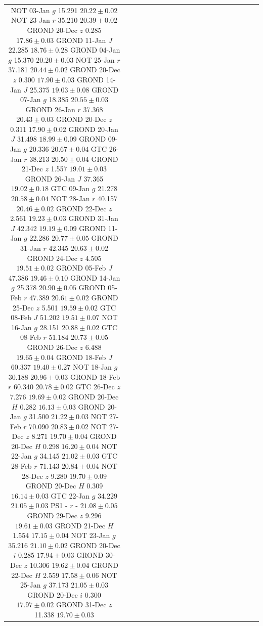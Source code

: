 \documentclass[traditabstract,longauth]{aa}
\begin{document}
\begin{appendix}
\begin{landscape}
\begin{table}
\begin{tabular}{ccccc|ccccc|ccccc|ccccc}
NOT		03-Jan		$g$		15.291		$	20.22	\pm	0.02	$		
NOT		23-Jan		$r$		35.210		$	20.39	\pm	0.02	$		
GROND		20-Dec		$z$		0.285		$	17.86	\pm	0.03	$		
GROND		11-Jan		$J$		22.285		$	18.76	\pm	0.28	$	
GROND		04-Jan		$g$		15.370		$	20.20	\pm	0.03	$		
NOT		25-Jan		$r$		37.181		$	20.44	\pm	0.02	$		
GROND		20-Dec		$z$		0.300		$	17.90	\pm	0.03	$		
GROND		14-Jan		$J$		25.375		$	19.03	\pm	0.08	$	
GROND		07-Jan		$g$		18.385		$	20.55	\pm	0.03	$		
GROND		26-Jan		$r$		37.368		$	20.43	\pm	0.03	$		
GROND		20-Dec		$z$		0.311		$	17.90	\pm	0.02	$		
GROND		20-Jan		$J$		31.498		$	18.99	\pm	0.09	$	
GROND		09-Jan		$g$		20.336		$	20.67	\pm	0.04	$		
GTC		26-Jan		$r$		38.213		$	20.50	\pm	0.04	$		
GROND		21-Dec		$z$		1.557		$	19.01	\pm	0.03	$		
GROND		26-Jan		$J$		37.365		$	19.02	\pm	0.18	$	
GTC		09-Jan		$g$		21.278		$	20.58	\pm	0.04	$		
NOT		28-Jan		$r$		40.157		$	20.46	\pm	0.02	$		
GROND		22-Dec		$z$		2.561		$	19.23	\pm	0.03	$		
GROND		31-Jan		$J$		42.342		$	19.19	\pm	0.09	$	
GROND		11-Jan		$g$		22.286		$	20.77	\pm	0.05	$		
GROND		31-Jan		$r$		42.345		$	20.63	\pm	0.02	$		
GROND		24-Dec		$z$		4.505		$	19.51	\pm	0.02	$		
GROND		05-Feb		$J$		47.386		$	19.46	\pm	0.10	$	
GROND		14-Jan		$g$		25.378		$	20.90	\pm	0.05	$		
GROND		05-Feb		$r$		47.389		$	20.61	\pm	0.02	$		
GROND		25-Dec		$z$		5.501		$	19.59	\pm	0.02	$		
GTC		08-Feb		$J$		51.202		$	19.51	\pm	0.07	$	
NOT		16-Jan		$g$		28.151		$	20.88	\pm	0.02	$		
GTC		08-Feb		$r$		51.184		$	20.73	\pm	0.05	$		
GROND		26-Dec		$z$		6.488		$	19.65	\pm	0.04	$		
GROND		18-Feb		$J$		60.337		$	19.40	\pm	0.27	$	
NOT		18-Jan		$g$		30.188		$	20.96	\pm	0.03	$		
GROND		18-Feb		$r$		60.340		$	20.78	\pm	0.02	$		
GTC		26-Dec		$z$		7.276		$	19.69	\pm	0.02	$		
GROND		20-Dec		$H$		0.282		$	16.13	\pm	0.03	$	
GROND		20-Jan		$g$		31.500		$	21.22	\pm	0.03	$		
NOT		27-Feb		$r$		70.090		$	20.83	\pm	0.02	$		
NOT		27-Dec		$z$		8.271		$	19.70	\pm	0.04	$		
GROND		20-Dec		$H$		0.298		$	16.20	\pm	0.04	$	
NOT		22-Jan		$g$		34.145		$	21.02	\pm	0.03	$		
GTC		28-Feb		$r$		71.143		$	20.84	\pm	0.04	$		
NOT		28-Dec		$z$		9.280		$	19.70	\pm	0.09	$		
GROND		20-Dec		$H$		0.309		$	16.14	\pm	0.03	$	
GTC		22-Jan		$g$		34.229		$	21.05	\pm	0.03	$		
PS1		-		$r$		-		$	21.08	\pm	0.05	$		
GROND		29-Dec		$z$		9.296		$	19.61	\pm	0.03	$		
GROND		21-Dec		$H$		1.554		$	17.15	\pm	0.04	$	
NOT		23-Jan		$g$		35.216		$	21.10	\pm	0.02	$		
GROND		20-Dec		$i$		0.285		$	17.94	\pm	0.03	$		
GROND		30-Dec		$z$		10.306		$	19.62	\pm	0.04	$		
GROND		22-Dec		$H$		2.559		$	17.58	\pm	0.06	$	
NOT		25-Jan		$g$		37.173		$	21.05	\pm	0.03	$		
GROND		20-Dec		$i$		0.300		$	17.97	\pm	0.02	$		
GROND		31-Dec		$z$		11.338		$	19.70	\pm	0.03	$		

\end{tabular}
\end{table}
\end{landscape}
\end{appendix}
\end{document}
